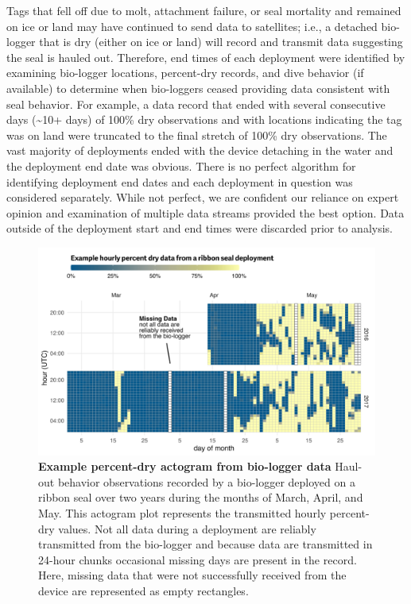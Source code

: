 \documentclass[fleqn,10pt,lineno]{wlpeerj} %
\begin{document}
Tags that fell off due to molt, attachment failure, or seal mortality and remained
on ice or land may have continued to send data to satellites; i.e., a detached
bio-logger that is dry (either on ice or land) will record and transmit data
suggesting the seal is hauled out. Therefore, end times of each deployment were
identified by examining bio-logger locations, percent-dry records, and dive
behavior (if available) to determine when bio-loggers ceased providing data
consistent with seal behavior. For example, a data record that ended with several
consecutive days (\textasciitilde10+ days) of 100\% dry observations and with locations
indicating the tag was on land were truncated to the final
stretch of 100\% dry observations. The vast majority of deployments ended with the
device detaching in the water and the deployment end date was obvious. There is
no perfect algorithm for identifying deployment end dates and each deployment in
question was considered separately. While not perfect, we are confident our
reliance on expert opinion and examination of multiple data streams provided the
best option. Data outside of the deployment start and end times were discarded
prior to analysis.










\begin{figure}
\includegraphics[width=1\linewidth]{../figures/examplePlot-1} \caption{\textbf{Example percent-dry actogram from bio-logger data}
\linebreak Haul-out behavior observations recorded by a bio-logger deployed on a
ribbon seal over two years during the months of March, April, and May. This
actogram plot represents the transmitted hourly percent-dry values. Not all data
during a deployment are reliably transmitted from the bio-logger and because data
are transmitted in 24-hour chunks occasional missing days are present in the
record. Here, missing data that were not successfully received from the device
are represented as empty rectangles.}\label{fig:examplePlot}
\end{figure}
\end{document}
